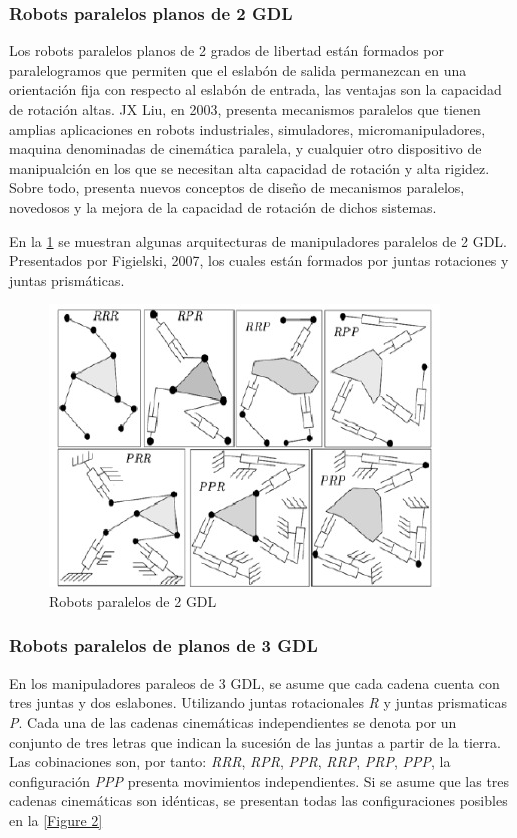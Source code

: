 \documentclass[letter,openrigh,12pt,spanish]{report}
\begin{document}
\subsubsection{Robots paralelos planos de 2 GDL}

Los robots paralelos planos de 2 grados de libertad est\'an formados por paralelogramos que permiten que el eslab\'on de salida permanezcan en una orientaci\'on fija con respecto al eslab\'on de entrada, las ventajas son la capacidad de rotaci\'on altas. JX Liu, en 2003, presenta mecanismos paralelos que tienen amplias aplicaciones en robots industriales, simuladores, micromanipuladores, maquina denominadas de cinem\'atica paralela, y cualquier otro dispositivo de manipualci\'on en los que se necesitan alta capacidad de rotaci\'on y alta rigidez. Sobre todo, presenta nuevos conceptos de dise\~no de mecanismos paralelos, novedosos y la mejora de la capacidad de rotaci\'on de dichos sistemas.

En la \ref{Figure 1} se muestran algunas arquitecturas de manipuladores paralelos de 2 GDL. Presentados por Figielski, 2007, los cuales est\'an formados por juntas rotaciones y juntas prism\'aticas.

\begin{figure}[htp]
\centering
\includegraphics[scale=1.00]{1.jpg}
\caption{Robots paralelos de 2 GDL}
\label{Figure 1}
\end{figure}

\subsubsection{Robots paralelos de planos de 3 GDL}

En los manipuladores paraleos de 3 GDL, se asume que cada cadena cuenta con tres juntas y dos eslabones. Utilizando juntas rotacionales \textit{R} y juntas prismaticas \textit{P}. Cada una de las cadenas cinem\'aticas independientes se denota por un conjunto de tres letras que indican la sucesi\'on de las juntas a partir de la tierra. Las cobinaciones son, por tanto: \textit{RRR}, \textit{RPR}, \textit{PPR}, \textit{RRP}, \textit{PRP}, \textit{PPP}, la configuraci\'on \textit{PPP} presenta movimientos independientes. Si se asume que las tres cadenas cinem\'aticas son id\'enticas, se presentan todas las configuraciones posibles en la \ref{Figure 2}
\end{document}
